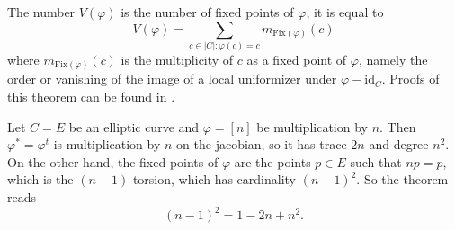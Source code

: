 The number $V(\varphi)$ is the number of fixed points of $\varphi$, it is equal to 
$$
V(\varphi) = \sum_{c \in |C| : \varphi(c) = c} m_\text{Fix$(\varphi)$} (c)
$$
where $m_\text{Fix$(\varphi)$} (c)$ is the multiplicity of $c$ as a fixed point of $\varphi$, namely the order or vanishing of the image of a local uniformizer under $\varphi - \text{id}_C$. Proofs of this theorem can be found in \cite{Lang, Weil}.

\begin{example}
Let $C = E$ be an elliptic curve and $\varphi = [n]$ be multiplication by $n$. Then $\varphi^* = \varphi^t$ is multiplication by $n$ on the jacobian, so it has trace $2n$ and degree $n^2$. On the other hand, the fixed points of $\varphi$ are the points $p \in E$ such that $n p = p$, which is the $(n-1)$-torsion, which has cardinality $(n-1)^2$. So the theorem reads
$$
(n-1)^2 = 1 - 2n + n^2.
$$
\end{example}

